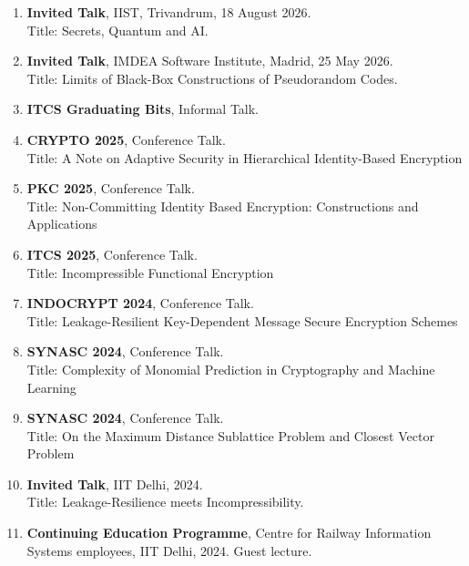 \documentclass[margin]{res} %
\begin{document}
\begin{resume}
\begin{enumerate}
    \item \textbf{Invited Talk}, IIST, Trivandrum, 18 August 2026.\\
    Title: Secrets, Quantum and AI.

    \item \textbf{Invited Talk}, IMDEA Software Institute, Madrid, 25 May 2026.\\
    Title: Limits of Black-Box Constructions of Pseudorandom Codes.

    \item \textbf{ITCS Graduating Bits}, Informal Talk.\\

    \item \textbf{CRYPTO 2025}, Conference Talk.\\
    Title: A Note on Adaptive Security in Hierarchical Identity-Based Encryption
    
    \item \textbf{PKC 2025}, Conference Talk.\\
    Title: Non-Committing Identity Based Encryption: Constructions and Applications
    
    \item \textbf{ITCS 2025}, Conference Talk.\\
    Title: Incompressible Functional Encryption

    \item \textbf{INDOCRYPT 2024}, Conference Talk.\\
    Title: Leakage-Resilient Key-Dependent Message Secure Encryption Schemes
    
    \item \textbf{SYNASC 2024}, Conference Talk.\\
    Title: Complexity of Monomial Prediction in Cryptography and Machine Learning

    \item \textbf{SYNASC 2024}, Conference Talk.\\
    Title: On the Maximum Distance Sublattice Problem and Closest Vector Problem
    
    \item \textbf{Invited Talk}, IIT Delhi, 2024.\\
    Title: Leakage-Resilience meets Incompressibility.

    \item \textbf{Continuing Education Programme}, Centre for Railway Information Systems employees, IIT Delhi, 2024. Guest lecture.


\end{enumerate}
\end{resume}
\end{document}
